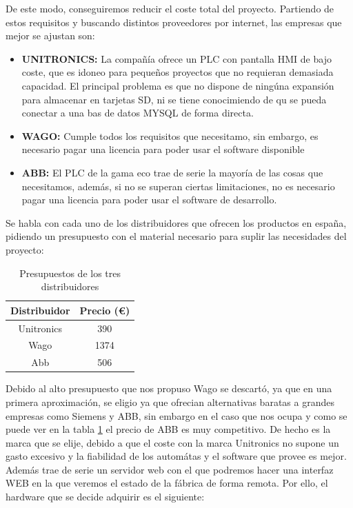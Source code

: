 De este modo, conseguiremos reducir el coste total del proyecto. Partiendo de estos requisitos y buscando distintos proveedores por internet, las empresas que mejor se ajustan son:

\begin{itemize}
		\item{\textbf{UNITRONICS:} La compañía ofrece un PLC con pantalla HMI de bajo coste, que es idoneo para pequeños proyectos que no requieran demasiada capacidad. El principal problema es que no dispone de ningúna expansión para almacenar en tarjetas SD, ni se tiene conocimiendo de qu se pueda conectar a una bas de datos MYSQL de forma directa.}
		\item{\textbf{WAGO:} Cumple todos los requisitos que necesitamo, sin embargo, es necesario pagar una licencia para poder usar el software disponible}
		\item{\textbf{ABB:} El PLC de la gama eco trae de serie la mayoría de las cosas que necesitamos, además, si no se superan ciertas limitaciones, no es necesario pagar una licencia para poder usar el software de desarrollo.}
\end{itemize}

Se habla con cada uno de los distribuidores que ofrecen los productos en españa, pidiendo un presupuesto con el material necesario para suplir las necesidades del proyecto:

\begin{table}[H]
\centering
\begin{tabular}{cc}
{\bf Distribuidor} & {\bf Precio (\euro{})} \\ \hline
Unitronics         & 390              \\
Wago               & 1374             \\
Abb                & 506              \\ \hline
\end{tabular}
\caption{Presupuestos de los tres distribuidores}
\label{tab:presupuestos}
\end{table}


Debido al alto presupuesto que nos propuso Wago se descartó, ya que en una primera aproximación, se eligio ya que ofrecian alternativas baratas a grandes empresas como Siemens y ABB, sin embargo en el caso que nos ocupa y como se puede ver en la tabla \ref{tab:presupuestos} el precio de ABB es muy competitivo. De hecho es la marca que se elije, debido a que el coste con la marca Unitronics no supone un gasto excesivo y la fiabilidad de los automátas y el software que provee es mejor. Además trae de serie un servidor web con el que podremos hacer una interfaz WEB en la que veremos el estado de la fábrica de forma remota. Por ello, el hardware que se decide adquirir es el siguiente:

